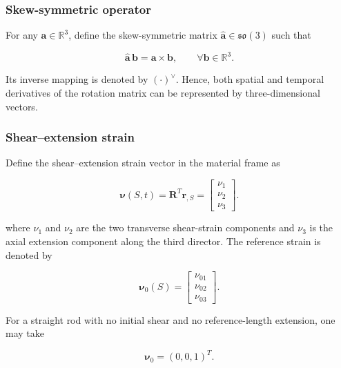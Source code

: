 \subsubsection{Skew-symmetric operator}\label{sec:rod-1-2-2}

For any \(\mathbf{a} \in \mathbb{R}^{3}\), define the skew-symmetric matrix \(\widehat{\mathbf{a}} \in \mathfrak{so}(3)\) such that\cite{Sola2018MicroLie,MarsdenRatiu1999MechanicsSymmetry}

\begin{equation}
\label{eq:rod-1-7}
\widehat{\mathbf{a}}\,\mathbf{b} = \mathbf{a} \times \mathbf{b},\quad\quad\forall\mathbf{b} \in \mathbb{R}^{3}.
\end{equation}

Its inverse mapping is denoted by \(( \cdot )^{\vee}\). Hence, both spatial and temporal derivatives of the rotation matrix can be represented by three-dimensional vectors.

\subsubsection{Shear--extension strain}\label{sec:rod-1-2-3}

Define the shear--extension strain vector in the material frame as

\begin{equation}
\label{eq:rod-1-8}
\bm{\nu}(S,t) = \mathbf{R}^{T}\mathbf{r}_{,S} = \begin{bmatrix}
\nu_{1} \\
\nu_{2} \\
\nu_{3}
\end{bmatrix}.
\end{equation}

where \(\nu_{1}\) and \(\nu_{2}\) are the two transverse shear-strain components and \(\nu_{3}\) is the axial extension component along the third director. The reference strain is denoted by

\begin{equation}
\label{eq:rod-1-9}
\bm{\nu}_{0}(S) = \begin{bmatrix}
\nu_{01} \\
\nu_{02} \\
\nu_{03}
\end{bmatrix}.
\end{equation}

For a straight rod with no initial shear and no reference-length extension, one may take

\begin{equation}
\label{eq:rod-1-10}
\bm{\nu}_{0} = (0,0,1)^{T}.
\end{equation}

